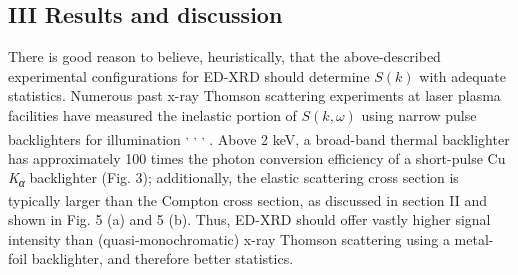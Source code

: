 \subsection{III Results and
discussion}\label{iii-results-and-discussion}

There is good reason to believe, heuristically, that the above-described
experimental configurations for ED-XRD should determine
\(S\left( k \right)\) with adequate statistics. Numerous past x-ray
Thomson scattering experiments at laser plasma facilities have measured
the inelastic portion of \(S\left( k,\omega \right)\) using narrow pulse
backlighters for illumination
\hyperref[s.-h.-glenzer-and-r.-redmer-reviews-of-modern-physics-81-1625-2009.]\cite{GLENZER2009X}\textsuperscript{,}
\hyperref[h.-j.-lee-et-al.-physical-review-letters-102-115001-2009.]\cite{LEE2009X}\textsuperscript{,}
\hyperref[c.-fortmann-h.-j.-lee-t.-doeppner-r.-w.-falcone-a.-l.-kritcher-o.-l.-landen-and-s.-h.-glenzer-physical-review-letters-108-175006-2012.]\cite{FORTMANN2012MEASUREMENT}\textsuperscript{,}
\hyperref[r.-tommasini-et-al.-review-of-scientific-instruments-79-10e901-2008.]\cite{TOMMASINI2010DEVELOPMENT, KRITCHER2008ULTRAFAST, GLENZER2003DEMONSTRATION, GREGORI2006MEASUREMENT}.
Above 2 keV, a broad-band thermal backlighter has approximately 100
times the photon conversion efficiency of a short-pulse Cu
\emph{K\textsubscript{α}} backlighter (Fig. 3); additionally, the
elastic scattering cross section is typically larger than the Compton
cross section, as discussed in section II and shown in Fig. 5 (a) and 5
(b). Thus, ED-XRD should offer vastly higher signal intensity than
(quasi-monochromatic) x-ray Thomson scattering using a metal-foil
backlighter, and therefore better statistics.

